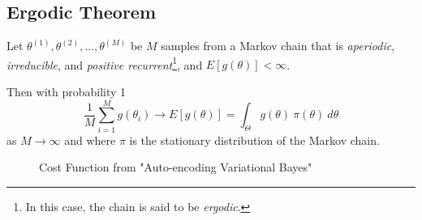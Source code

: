 \documentclass[11pt, oneside]{article}   	%
\begin{document}
\subsection{Ergodic Theorem}
\label{sec:ergodic}
Let $\theta^{(1)}, \theta^{(2)}, \hdots, \theta^{(M)}$ be $M$ samples from a Markov chain that is \emph{aperiodic}, \emph{irreducible}, and \emph{positive recurrent}\footnote{In this case, the chain is said to be \emph{ergodic}.}, and $E[g(\theta)] < \infty$.

\bigskip
\noindent
Then with probability 1
\begin{equation}
\frac{1}{M}\sum\limits_{i = 1}^{M} g(\theta_{i}) \rightarrow E[g(\theta)]  = \int_{\Theta}^{}g(\theta) \: \pi(\theta) \:d\theta
\end{equation}
as $M \rightarrow \infty$ and where $\pi$ is the stationary distribution of the Markov chain.


\begin{figure}
\caption{Cost Function from "Auto-encoding Variational Bayes"}
\label{fig:vae_cost}
\end{figure}
\end{document}
